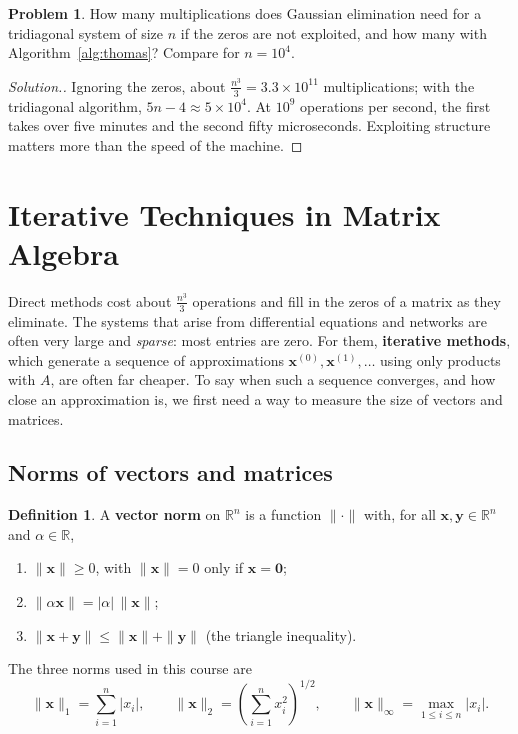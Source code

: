 \documentclass[11pt,a4paper]{article}
\numberwithin{equation}{section}
\theoremstyle{definition}
\newtheorem{defn}[thm]{Definition}
\newtheorem{problemx}{Problem}[subsection]
\newenvironment{problem}{\begin{problemx}}{\end{problemx}}
\newenvironment{solution}
  {\renewcommand{\qedsymbol}{}\begin{proof}[\textit{Solution}.]}
  {\end{proof}}
\begin{document}
\begin{problem}
How many multiplications does Gaussian elimination need for a tridiagonal system of size $n$ if the zeros are not exploited, and how
many with Algorithm~\ref{alg:thomas}? Compare for $n = 10^4$.
\end{problem}
\begin{solution}
Ignoring the zeros, about $\frac{n^3}{3} = 3.3\times10^{11}$ multiplications; with the tridiagonal algorithm, $5n-4\approx5\times10^4$. At
$10^9$ operations per second, the first takes over five minutes and the second fifty microseconds. Exploiting structure matters more than
the speed of the machine.
\end{solution}


\section{Iterative Techniques in Matrix Algebra}
\label{sec:iterative}

Direct methods cost about $\frac{n^3}{3}$ operations and fill in the zeros of a matrix as they eliminate. The systems that arise from
differential equations and networks are often very large and \emph{sparse}: most entries are zero. For them, \textbf{iterative methods},
which generate a sequence of approximations $\mathbf x^{(0)},\mathbf x^{(1)},\dots$ using only products with $A$, are often far cheaper. To
say when such a sequence converges, and how close an approximation is, we first need a way to measure the size of vectors and matrices.


\subsection{Norms of vectors and matrices}
\label{sec:norms}

\begin{defn}
A \textbf{vector norm} on $\mathbb R^n$ is a function $\|\cdot\|$ with, for all $\mathbf x,\mathbf y\in\mathbb R^n$ and $\alpha\in\mathbb R$,
\begin{enumerate}
\item[(i)] $\|\mathbf x\|\geq0$, with $\|\mathbf x\| = 0$ only if $\mathbf x = \mathbf 0$;
\item[(ii)] $\|\alpha\mathbf x\| = |\alpha|\,\|\mathbf x\|$;
\item[(iii)] $\|\mathbf x+\mathbf y\|\leq\|\mathbf x\|+\|\mathbf y\|$ (the triangle inequality).
\end{enumerate}
The three norms used in this course are
$$\|\mathbf x\|_1 = \sum_{i=1}^n|x_i|,\qquad \|\mathbf x\|_2 = \left(\sum_{i=1}^nx_i^2\right)^{1/2},\qquad \|\mathbf x\|_\infty = \max_{1\leq i\leq n}|x_i| .$$
\end{defn}
\end{document}
